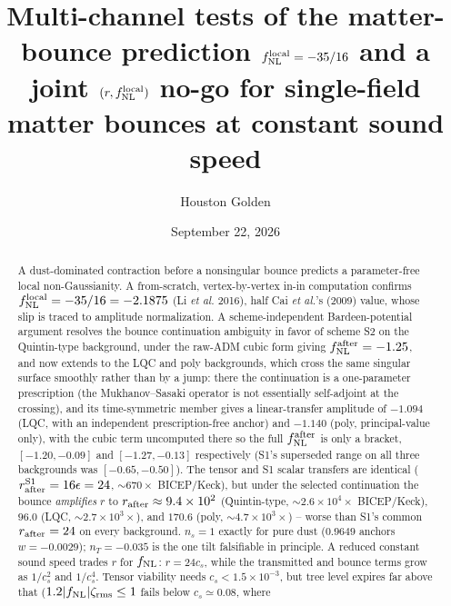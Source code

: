 \documentclass[aps,prd,twocolumn,superscriptaddress,nofootinbib,longbibliography]{revtex4-2}
\newcommand{\fnl}{f_{\rm NL}}
\newcommand{\fnlloc}{f_{\rm NL}^{\rm local}}
\newcommand{\paperVersion}{v3M.0.32}
\newcommand{\paperTimestamp}{September 22, 2026}
\begin{document}
\preprint{\paperVersion}

\title{Multi-channel tests of the matter-bounce prediction $\fnlloc=-35/16$
and a joint $(r,\fnlloc)$ no-go for single-field matter bounces at constant sound speed}

\author{Houston Golden}

\date{\paperTimestamp}

\begin{abstract}
A dust-dominated contraction before a nonsingular bounce predicts a
parameter-free local non-Gaussianity. A from-scratch, vertex-by-vertex
in-in computation confirms $\fnlloc=-35/16=-2.1875$ (Li \textit{et al.}
2016), half Cai \textit{et al.}'s (2009)
value, whose slip is traced to amplitude normalization. A scheme-independent
Bardeen-potential argument resolves the bounce continuation ambiguity in
favor of scheme S2 on the Quintin-type background, under the raw-ADM cubic
form giving $\fnl^{\rm after}=-1.25$, and now extends to the LQC and poly
backgrounds, which cross the same singular surface smoothly rather than by
a jump: there the continuation is a one-parameter prescription (the
Mukhanov--Sasaki operator is not essentially self-adjoint at the
crossing), and its time-symmetric member gives a linear-transfer amplitude
of $-1.094$ (LQC, with an independent prescription-free anchor) and
$-1.140$ (poly, principal-value only), with the cubic term uncomputed
there so the full $\fnl^{\rm after}$ is only a bracket, $[-1.20,-0.09]$
and $[-1.27,-0.13]$ respectively (S1's superseded range on all three
backgrounds was $[-0.65,-0.50]$). The tensor and S1 scalar transfers are
identical ($r_{\rm after}^{\rm S1}=16\epsilon=24$, $\sim670\times$
BICEP/Keck), but under the selected continuation the bounce
\emph{amplifies} $r$ to $r_{\rm after}\approx9.4\times10^2$ (Quintin-type,
$\sim2.6\times10^4\times$ BICEP/Keck), $96.0$ (LQC, $\sim2.7\times10^3\times$),
and $170.6$ (poly, $\sim4.7\times10^3\times$) -- worse than S1's common
$r_{\rm after}=24$ on every background.
$n_s=1$ exactly for pure dust ($0.9649$ anchors $w=-0.0029$);
$n_T=-0.035$ is the one tilt falsifiable in principle. A reduced
constant sound speed trades $r$ for $\fnl$: $r=24c_s$, while the
transmitted and bounce terms grow as $1/c_s^2$ and $1/c_s^4$. Tensor
viability needs $c_s<1.5\times10^{-3}$, but tree level expires far above
that ($1.2|\fnl|\zeta_{\rm rms}\le1$ fails below $c_s\simeq0.08$, where

\end{abstract}
\end{document}
